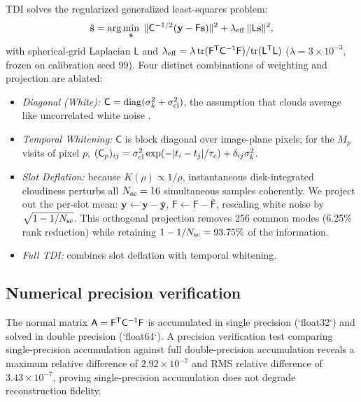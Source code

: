 \documentclass[twocolumn,10pt]{article}
\begin{document}
TDI solves the regularized generalized least-squares problem:
\begin{equation}
\hat{\mathbf{s}}=\arg\min_{\mathbf{s}}\;
\|\mathsf{C}^{-1/2}(\mathbf{y}-\mathsf{F}\mathbf{s})\|^2
+\lambda_{\rm eff}\,\|\mathsf{L}\mathbf{s}\|^2,
\label{eq:tdi}
\end{equation}
with spherical-grid Laplacian $\mathsf{L}$ and
$\lambda_{\rm eff}=\lambda\,{\rm tr}(\mathsf{F}^{\sf T}\mathsf{C}^{-1}\mathsf{F})/{\rm tr}(\mathsf{L}^{\sf T}\mathsf{L})$
($\lambda=3\times10^{-3}$, frozen on calibration seed 99).
Four distinct combinations of weighting and projection are ablated:
\begin{itemize}
\item {\it Diagonal (White):} $\mathsf{C}=\mathrm{diag}(\sigma_k^2+\sigma_{\rm cl}^2)$,
the assumption that clouds average like uncorrelated white noise \citep{toth25clouds}.
\item {\it Temporal Whitening:} $\mathsf{C}$ is block diagonal over image-plane
pixels; for the $M_p$ visits of pixel $p$,
$(\mathsf{C}_p)_{ij}=\sigma_{\rm cl}^2\exp(-|t_i-t_j|/\tau_c)+\delta_{ij}\sigma_k^2$.
\item {\it Slot Deflation:} because $K(\rho)\propto1/\rho$, instantaneous
disk-integrated cloudiness perturbs all $N_{\rm sc}=16$ simultaneous samples
coherently. We project out the per-slot mean: $\mathbf{y}\leftarrow\mathbf{y}-\bar{\mathbf{y}}$,
$\mathsf{F}\leftarrow\mathsf{F}-\bar{\mathsf{F}}$, rescaling white noise by
$\sqrt{1-1/N_{\rm sc}}$. This orthogonal projection removes 256 common modes
(6.25\% rank reduction) while retaining $1-1/N_{\rm sc}=93.75\%$ of the information.
\item {\it Full TDI:} combines slot deflation with temporal whitening.
\end{itemize}

\subsection{Numerical precision verification}
The normal matrix $\mathsf{A}=\mathsf{F}^{\sf T}\mathsf{C}^{-1}\mathsf{F}$
is accumulated in single precision (`float32`) and solved in double precision
(`float64`). A precision verification test comparing single-precision
accumulation against full double-precision accumulation reveals a maximum
relative difference of $2.92\times10^{-7}$ and RMS relative difference of
$3.43\times10^{-7}$, proving single-precision accumulation does not degrade
reconstruction fidelity.
\end{document}
